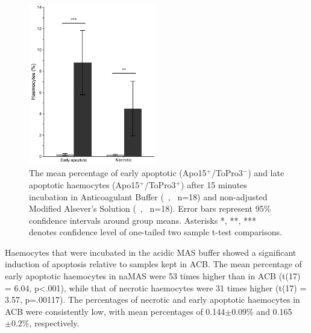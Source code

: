 \begin{figure}[H]
    \centering
    \includegraphics[width=0.5\textwidth]{figures/Method development/Apo15 pH 2.pdf}
    \caption{The mean percentage of early apoptotic (Apo15$^{+}$/ToPro3$^{-}$) and late apoptotic haemocytes (Apo15$^{+}$/ToPro3$^{+}$) after 15 minutes incubation in Anticoagulant Buffer (\, \protect\customgraybox, \ n=18) and non-adjusted Modified Alsever's Solution (\, \protect\darkgraybox, \ n=18). Error bars represent 95\% confidence intervals around group means. Asterisks *, **, *** denotes confidence level of one-tailed two sample t-test comparisons.}
    \label{fig:pH_Apo}
\end{figure}

Haemocytes that were incubated in the acidic MAS buffer showed a significant induction of apoptosis relative to samples kept in ACB. The mean percentage of early apoptotic haemocytes in naMAS were 53 times higher than in ACB (t(17) = 6.04, p<.001), while that of necrotic haemocytes were 31 times higher (t(17) = 3.57, p=.00117). The percentages of necrotic and early apoptotic haemocytes in ACB were consistently low, with mean percentages of 0.144$\pm{0.09}$\% and 0.165$\pm{0.2}$\%, respectively.

